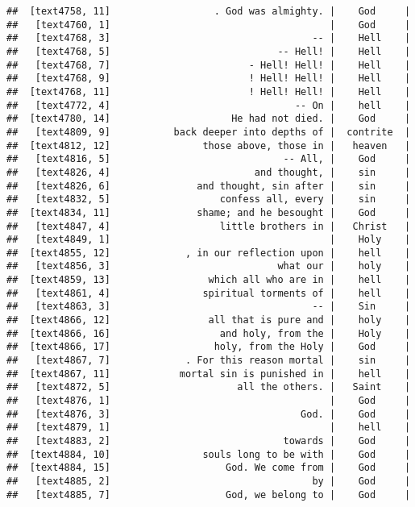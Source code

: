 \documentclass[]{article}
\begin{document}
\begin{verbatim}
##  [text4758, 11]                  . God was almighty. |    God     |
##   [text4760, 1]                                      |    God     |
##   [text4768, 3]                                   -- |    Hell    |
##   [text4768, 5]                             -- Hell! |    Hell    |
##   [text4768, 7]                        - Hell! Hell! |    Hell    |
##   [text4768, 9]                        ! Hell! Hell! |    Hell    |
##  [text4768, 11]                        ! Hell! Hell! |    Hell    |
##   [text4772, 4]                                -- On |    hell    |
##  [text4780, 14]                     He had not died. |    God     |
##   [text4809, 9]           back deeper into depths of |  contrite  |
##  [text4812, 12]                those above, those in |   heaven   |
##   [text4816, 5]                              -- All, |    God     |
##   [text4826, 4]                         and thought, |    sin     |
##   [text4826, 6]               and thought, sin after |    sin     |
##   [text4832, 5]                   confess all, every |    sin     |
##  [text4834, 11]               shame; and he besought |    God     |
##   [text4847, 4]                   little brothers in |   Christ   |
##   [text4849, 1]                                      |    Holy    |
##  [text4855, 12]             , in our reflection upon |    hell    |
##   [text4856, 3]                             what our |    holy    |
##  [text4859, 13]                 which all who are in |    hell    |
##   [text4861, 4]                spiritual torments of |    hell    |
##   [text4863, 3]                                   -- |    Sin     |
##  [text4866, 12]                 all that is pure and |    holy    |
##  [text4866, 16]                   and holy, from the |    Holy    |
##  [text4866, 17]                  holy, from the Holy |    God     |
##   [text4867, 7]             . For this reason mortal |    sin     |
##  [text4867, 11]            mortal sin is punished in |    hell    |
##   [text4872, 5]                      all the others. |   Saint    |
##   [text4876, 1]                                      |    God     |
##   [text4876, 3]                                 God. |    God     |
##   [text4879, 1]                                      |    hell    |
##   [text4883, 2]                              towards |    God     |
##  [text4884, 10]                souls long to be with |    God     |
##  [text4884, 15]                    God. We come from |    God     |
##   [text4885, 2]                                   by |    God     |
##   [text4885, 7]                    God, we belong to |    God     |

\end{verbatim}
\end{document}

